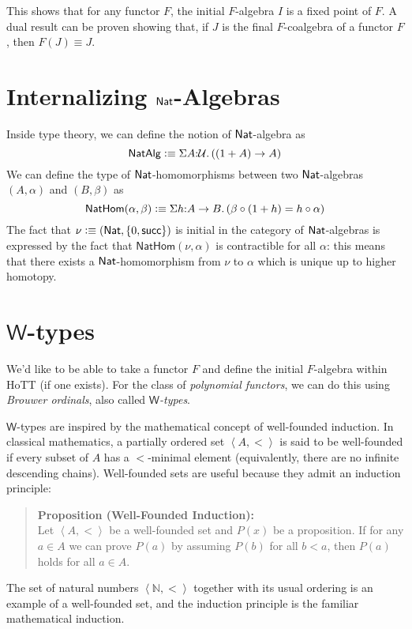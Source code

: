 \documentclass[11pt]{article}
\newcommand*{\z}{0}
\newcommand*{\s}{\mathsf{succ}}
\newcommand*{\W}{\mathsf{W}}
\begin{document}
This shows that for any functor $F$, the initial $F$-algebra $I$ is a fixed
point of $F$. A dual result can be proven showing that, if $J$ is the final 
$F$-coalgebra of a functor $F$, then $F(J) \equiv J$.

\section{Internalizing $\mathsf{Nat}$-Algebras}

Inside type theory, we can define the notion of $\mathsf{Nat}$-algebra as
\[
\mathsf{NatAlg} \vcentcolon\equiv \Sigma A{:}\mathcal{U}.\, ((1 + A) \to A)
\]
We can define the type of $\mathsf{Nat}$-homomorphisms between two $\mathsf{Nat}$-algebras $(A,\alpha)$ and $(B,\beta)$ as
\[
\mathsf{NatHom}(\alpha,\beta) \vcentcolon\equiv \Sigma h{:}A \to B.\, (\beta \circ (1 + h) = h \circ \alpha)
\]
The fact that $\nu \defeq \tuple{\Nat}{\{\z, \s\}}$ is initial in the category of $\mathsf{Nat}$-algebras is expressed by the fact that $\mathsf{NatHom}(\nu,\alpha)$ is contractible for all $\alpha$: this means that there exists a $\mathsf{Nat}$-homomorphism from $\nu$ to $\alpha$ which is unique up to higher homotopy.

\section{$\W$-types}
We'd like to be able to take a functor $F$ and define the initial $F$-algebra within HoTT (if one exists). For the class of \emph{polynomial functors}, we can do this using \emph{Brouwer ordinals}, also called \emph{$\W$-types}.

$\W$-types are inspired by the mathematical concept of well-founded induction. In classical mathematics, a partially ordered set $\left< A, < \right>$ is said to be well-founded if every subset of $A$ has a $<$-minimal element (equivalently, there are no infinite descending chains). Well-founded sets are useful because they admit an induction principle:
\begin{quote}
  \textbf{Proposition (Well-Founded Induction):} \\
  Let $\left<A , <\right>$ be a well-founded set and $P(x)$ be a proposition. If for any $a \in A$ we can prove $P(a)$ by assuming $P(b)$ for all $b < a$, then $P(a)$ holds for all $a \in A$.
\end{quote}
The set of natural numbers $\left< \mathbb{N}, <\right>$ together with its usual ordering is an example of a well-founded set, and the induction principle is the familiar mathematical induction.
\end{document}
